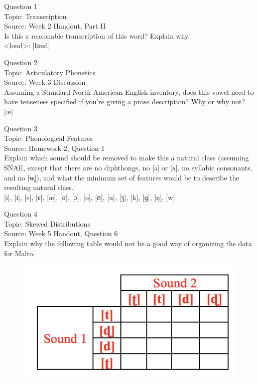 \documentclass[12pt]{article}
\begin{document}
{\large Question 1}\\

Topic: Transcription\\
Source: Week 2 Handout, Part II\\

Is this a reasonable transcription of this word? Explain why.\\

<loud>: {[lɑud]}


\newpage

{\large Question 2}\\

Topic: Articulatory Phonetics\\
Source: Week 3 Discussion\\

Assuming a Standard North American English inventory, does this vowel need to have tenseness specified if you're giving a prose description? Why or why not?\\

{[æ]}


\newpage

{\large Question 3}\\

Topic: Phonological Features\\
Source: Homework 2, Question 1\\

Explain which sound should be removed to make this a natural class (assuming SNAE, except that there are no diphthongs, no [ə] or [ʌ], no syllabic consonants, and no [w̥]), and what the minimum set of features would be to describe the resulting natural class.\\

{[i]}, {[ɪ]}, {[e]}, {[ɛ]}, {[æ]}, {[ɑ]}, {[ɔ]}, {[o]}, {[ʊ]}, {[u]}, {[ʒ]}, {[k]}, {[ɡ]}, {[ŋ]}, {[w]}


\newpage

{\large Question 4}\\

Topic: Skewed Distributions\\
Source: Week 5 Handout, Question 6\\

Explain why the following table would not be a good way of organizing the data for Malto.\\

\begin{figure}[H]
\includegraphics{../images/Malto_table_bad.png}
\end{figure}
\end{document}
